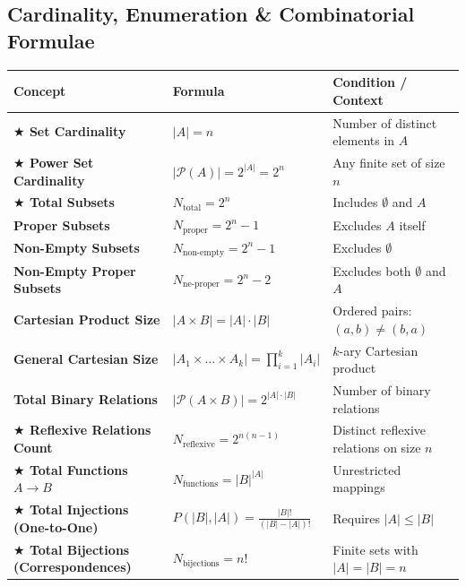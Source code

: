 \documentclass[11pt,a4paper]{article}
\begin{document}
\subsection{Cardinality, Enumeration \& Combinatorial Formulae}
\begin{notebox}
\renewcommand{\arraystretch}{1.15}
\begin{tabularx}{\linewidth}{@{}l X l@{}}
\toprule
\textbf{\color{navy}Concept} & \textbf{\color{navy}Formula} & \textbf{\color{navy}Condition / Context} \\
\midrule
\textbf{\color{gold!90!black}$\bigstar$ Set Cardinality} & $|A| = n$ & Number of distinct elements in $A$ \\
\textbf{\color{gold!90!black}$\bigstar$ Power Set Cardinality} & $|\mathcal{P}(A)| = 2^{|A|} = 2^n$ & Any finite set of size $n$ \\
\textbf{\color{gold!90!black}$\bigstar$ Total Subsets} & $N_{\text{total}} = 2^n$ & Includes $\emptyset$ and $A$ \\
\textbf{Proper Subsets} & $N_{\text{proper}} = 2^n - 1$ & Excludes $A$ itself \\
\textbf{Non-Empty Subsets} & $N_{\text{non-empty}} = 2^n - 1$ & Excludes $\emptyset$ \\
\textbf{Non-Empty Proper Subsets} & $N_{\text{ne-proper}} = 2^n - 2$ & Excludes both $\emptyset$ and $A$ \\
\textbf{Cartesian Product Size} & $|A \times B| = |A| \cdot |B|$ & Ordered pairs: $(a, b) \neq (b, a)$ \\
\textbf{General Cartesian Size} & $|A_1 \times \dots \times A_k| = \prod_{i=1}^k |A_i|$ & $k$-ary Cartesian product \\
\textbf{Total Binary Relations} & $|\mathcal{P}(A \times B)| = 2^{|A| \cdot |B|}$ & Number of binary relations \\
\textbf{\color{gold!90!black}$\bigstar$ Reflexive Relations Count} & $N_{\text{reflexive}} = 2^{n(n-1)}$ & Distinct reflexive relations on size $n$ \\
\textbf{\color{gold!90!black}$\bigstar$ Total Functions $A \to B$} & $N_{\text{functions}} = |B|^{|A|}$ & Unrestricted mappings \\
\textbf{\color{gold!90!black}$\bigstar$ Total Injections (One-to-One)} & $P(|B|, |A|) = \frac{|B|!}{(|B|-|A|)!}$ & Requires $|A| \le |B|$ \\
\textbf{\color{gold!90!black}$\bigstar$ Total Bijections (Correspondences)} & $N_{\text{bijections}} = n!$ & Finite sets with $|A| = |B| = n$ \\

\end{tabularx}
\end{notebox}
\end{document}
